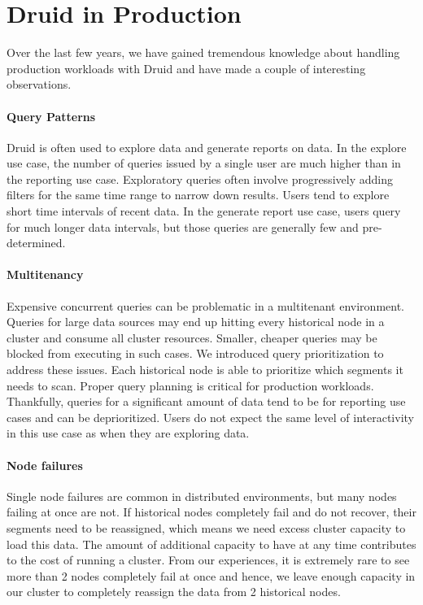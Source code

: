\documentclass{sig-alternate-2013}
\begin{document}
\section{Druid in Production}\label{sec:production}
Over the last few years, we have gained tremendous knowledge about handling
production workloads with Druid and have made a couple of interesting observations.

\paragraph{Query Patterns}
Druid is often used to explore data and generate reports on data. In the
explore use case, the number of queries issued by a single user are much higher
than in the reporting use case. Exploratory queries often involve progressively
adding filters for the same time range to narrow down results. Users tend to
explore short time intervals of recent data. In the generate report use case,
users query for much longer data intervals, but those queries are generally few
and pre-determined.

\paragraph{Multitenancy}
Expensive concurrent queries can be problematic in a multitenant
environment. Queries for large data sources may end up hitting every historical
node in a cluster and consume all cluster resources. Smaller, cheaper queries
may be blocked from executing in such cases. We introduced query prioritization
to address these issues. Each historical node is able to prioritize which
segments it needs to scan. Proper query planning is critical for production
workloads. Thankfully, queries for a significant amount of data tend to be for
reporting use cases and can be deprioritized. Users do not expect the same level of
interactivity in this use case as when they are exploring data.

\paragraph{Node failures}
Single node failures are common in distributed environments, but many nodes
failing at once are not. If historical nodes completely fail and do not
recover, their segments need to be reassigned, which means we need excess cluster
capacity to load this data. The amount of additional capacity to have at any
time contributes to the cost of running a cluster. From our experiences, it is
extremely rare to see more than 2 nodes completely fail at once and hence, we
leave enough capacity in our cluster to completely reassign the data from 2
historical nodes.
\end{document}
